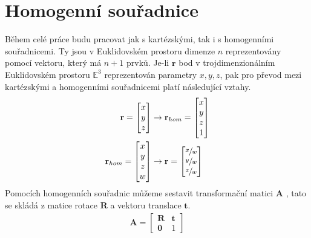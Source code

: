 \documentclass[twoside]{ctuthesis}
\newcommand{\tl}[1]{$\mathbf{#1}$}
\begin{document}
\section{Homogenní souřadnice}
Během celé práce budu pracovat jak s kartézskými, tak i s homogenními souřadnicemi. Ty jsou v Euklidovském prostoru dimenze $n$ reprezentovány pomocí vektoru, který má $n+1$ prvků. Je-li $\boldsymbol{r}$ bod v trojdimenzionálním Euklidovském prostoru $\mathbb{E}^3$ reprezentován parametry $x,y,z$, pak pro převod mezi kartézskými a homogenními souřadnicemi platí následující vztahy.
\begin{align}
    \mathbf{r} = \begin{bmatrix} x \\ y \\ z \end{bmatrix} &\rightarrow \mathbf{r}_{hom} = \begin{bmatrix} x \\ y \\ z \\ 1 \end{bmatrix} \\
    \mathbf{r}_{hom} = \begin{bmatrix} x \\ y \\ z \\ w \end{bmatrix} &\rightarrow \mathbf{r} = \begin{bmatrix} \sfrac{x}{w} \\ \sfrac{y}{w} \\ \sfrac{z}{w} \end{bmatrix}
\end{align}
Pomocích homogenních souřadnic můžeme sestavit transformační matici \tl{A} , tato se skládá z matice rotace \tl{R} a vektoru translace \tl{t}.
\begin{align}
    \mathbf{A} = \begin{bmatrix} \mathbf{R} & \mathbf{t} \\ \mathbf{0} & 1 \end{bmatrix}
\end{align}
\end{document}
